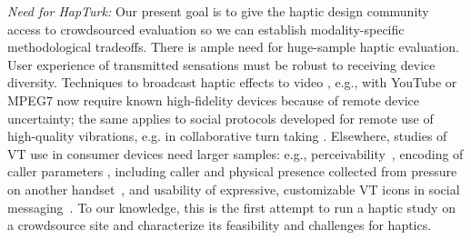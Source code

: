 {\it Need for HapTurk:} Our present goal is to give the haptic design community access to crowdsourced evaluation so we can establish modality-specific methodological tradeoffs.
%
There is ample need for huge-sample haptic evaluation. User experience of transmitted sensations must be robust to receiving device diversity.
Techniques to broadcast haptic effects to video \cite{Modhrain2001,Kim2009}, e.g., with YouTube \cite{AbdurRahman2010} or MPEG7 \cite{Eid2006,Ferre2008} now require known high-fidelity devices  because of remote device uncertainty;  
the same applies to social protocols developed for remote use of high-quality vibrations, e.g. in collaborative turn taking \cite{Chan2008}. 
Elsewhere, studies of VT use in consumer devices need larger samples: e.g., 
perceivability~\cite{Kaaresoja2005}, encoding of caller parameters \cite{Brown2006b}, including caller
 and physical presence collected from pressure on another handset~\cite{Hoggan2012}, and usability of expressive, customizable VT icons in social messaging~\cite{Israr2015}.
%
To our knowledge, this is the first attempt to run a haptic study on a crowdsource site and characterize its feasibility and challenges for haptics. 
			
    
    
